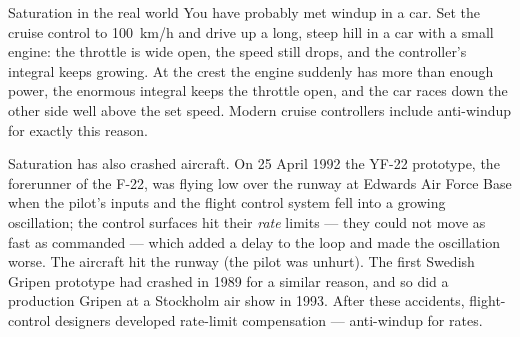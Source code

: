 \begin{curiosity}{Saturation in the real world}
You have probably met windup in a car. Set the cruise control to \SI{100}{km/h} and drive up a long, steep hill in a car with a small engine: the throttle is wide open, the speed still drops, and the controller's integral keeps growing. At the crest the engine suddenly has more than enough power, the enormous integral keeps the throttle open, and the car races down the other side well above the set speed. Modern cruise controllers include anti-windup for exactly this reason.

Saturation has also crashed aircraft. On 25 April 1992 the YF-22 prototype, the forerunner of the F-22, was flying low over the runway at Edwards Air Force Base when the pilot's inputs and the flight control system fell into a growing oscillation; the control surfaces hit their \emph{rate} limits — they could not move as fast as commanded — which added a delay to the loop and made the oscillation worse. The aircraft hit the runway (the pilot was unhurt). The first Swedish Gripen prototype had crashed in 1989 for a similar reason, and so did a production Gripen at a Stockholm air show in 1993. After these accidents, flight-control designers developed rate-limit compensation — anti-windup for rates.
\end{curiosity}

